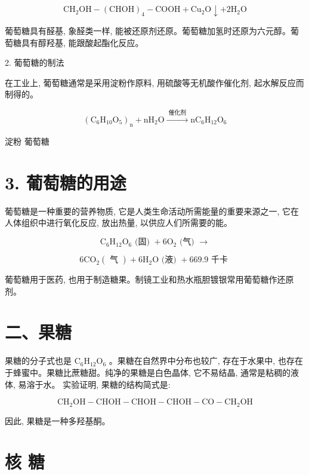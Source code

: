 \documentclass[10pt]{article}
\begin{document}
\[
{\mathrm{{CH}}}_{2}\mathrm{{OH}} - {\left( \mathrm{{CHOH}}\right) }_{4} - \mathrm{{COOH}} + {\mathrm{{Cu}}}_{2}\mathrm{O} \downarrow + 2{\mathrm{H}}_{2}\mathrm{O}
\]

葡萄糖具有醛基, 象醛类一样, 能被还原剂还原。葡萄糖加氢时还原为六元醇。葡萄糖具有醇羟基, 能跟酸起酯化反应。

2. 葡萄糖的制法

在工业上, 葡萄糖通常是采用淀粉作原料, 用硫酸等无机酸作催化剂, 起水解反应而制得的。

\[
{\left( {\mathrm{C}}_{6}{\mathrm{H}}_{10}{\mathrm{O}}_{5}\right) }_{\mathrm{n}} + {\mathrm{{nH}}}_{2}\mathrm{O}\xrightarrow[]{\text{ 催化剂 }}{\mathrm{{nC}}}_{6}{\mathrm{H}}_{12}{\mathrm{O}}_{6}
\]

淀粉 葡萄糖

\section*{3. 葡萄糖的用途}

葡萄糖是一种重要的营养物质, 它是人类生命活动所需能量的重要来源之一, 它在人体组织中进行氧化反应, 放出热量, 以供应人们所需要的能。

\[
{\mathrm{C}}_{6}{\mathrm{H}}_{12}{\mathrm{O}}_{6}\text{ (固) } + 6{\mathrm{O}}_{2}\text{ (气) } \rightarrow
\]

\[
6{\mathrm{{CO}}}_{2}\left( \text{ 气 }\right) + 6{\mathrm{H}}_{2}\mathrm{O}\text{ (液) } + {669.9}\text{ 千卡 }
\]

葡萄糖用于医药, 也用于制造糖果。制镜工业和热水瓶胆镀银常用葡萄糖作还原剂。

\section*{二、果糖}

果糖的分子式也是 \({\mathrm{C}}_{6}{\mathrm{H}}_{12}{\mathrm{O}}_{6}\) 。果糖在自然界中分布也较广, 存在于水果中, 也存在于蜂蜜中。果糖比蔗糖甜。纯净的果糖是白色晶体, 它不易结晶, 通常是粘稠的液体, 易溶于水。 实验证明, 果糖的结构简式是:

\[
{\mathrm{{CH}}}_{2}\mathrm{{OH}} - \mathrm{{CHOH}} - \mathrm{{CHOH}} - \mathrm{{CHOH}} - \mathrm{{CO}} - {\mathrm{{CH}}}_{2}\mathrm{{OH}}
\]

因此, 果糖是一种多羟基酮。

\section*{核 糖}
\end{document}
